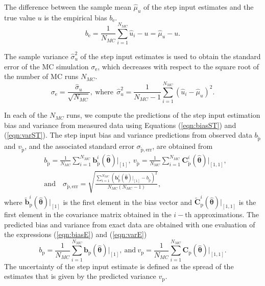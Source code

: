 The difference between the sample mean $\widehat{\mu}_u$ of the step input estimates and the true value $u$ is the empirical bias $b_\mathrm{e}$.
\begin{equation} {b}_\mathrm{e} = \frac{1}{N_{MC}} \sum_{i=1}^{N_{MC}}{ \widehat{u}_i - u } = \widehat{\mu}_u - u.  \end{equation}

The sample variance $\widehat{\sigma}_u^2$ of the step input estimates is used to obtain the standard error of the MC simulation $\sigma_\mathrm{e}$, which decreases with respect to the square root of the number of MC runs $N_{MC}$. 
\begin{equation}  \sigma_\mathrm{e} = \frac{\widehat{\sigma}_u}{\sqrt{N_{MC}}}, \ \mathrm{where} \ \ \widehat{\sigma}_u^2 = \frac{1}{N_{MC}-1} \sum_{i=1}^{N_{MC}}{ \left( \widehat{u}_i - \widehat{\mu}_u \right)^2 } . \end{equation}

In each of the $N_{MC}$ runs, we compute the predictions of the step input estimation bias and variance from measured data using Equations (\ref{eqn:biasST}) and (\ref{eqn:varST}). 
The step input bias and variance predictions from observed data $b_{\widetilde{\mathrm{p}}}$ and $v_{\widetilde{\mathrm{p}}}$, and the associated standard error $\sigma_{\widetilde{\mathrm{p}}\mathrm{,err}}$, are obtained from
\begin{equation} \begin{aligned} & b_{\widetilde{\mathrm{p}}} = \frac{1}{N_{MC}} \sum_{i=1}^{N_{MC}}{ \mathbf{b}_{\widetilde{\mathrm{p}}}^i \left( \widehat{\bm{\theta}} \right) \big|_{\left[1\right]} }, \ v_{\widetilde{\mathrm{p}}} = \frac{1}{N_{MC}} \sum_{i=1}^{N_{MC}}{ \mathrm{\mathbf{C}}_{\widetilde{\mathrm{p}}}^i \left( \widehat{\bm{\theta}} \right) \big|_{\left[1,1\right]} },  \\ & \mathrm{and} \quad \sigma_{\widetilde{\mathrm{p}}\mathrm{,err}} = \sqrt{   \frac{ \sum_{i=1}^{N_{MC}}{ \left( \mathbf{b}_{\widetilde{\mathrm{p}}}^i \left( \widehat{\bm{\theta}} \right) \big|_{\left[1\right]} - b_{\widetilde{\mathrm{p}}} \right)^2 } }{N_{MC}\left( N_{MC}-1 \right)}  } , \end{aligned} \end{equation}
where $\widetilde{\mathbf{b}}_{\mathrm{p}}^i \left( \widehat{\bm{\theta}} \right) \big|_{\left[1\right]}$ is the first element in the bias vector and $\widetilde{\mathbf{C}}_{\mathrm{p}}^i \left( \widehat{\bm{\theta}} \right) \big|_{\left[1,1\right]}$ is the first element in the covariance matrix obtained in the $i-\mathrm{th}$ approximations.
The predicted bias and variance from exact data are obtained with one evaluation of the expressions
(\ref{eqn:biasE}) and (\ref{eqn:varE})
\begin{equation} b_{\mathrm{p}} = \frac{1}{N_{MC}} \sum_{i=1}^{N_{MC}}{ \mathbf{b}_{\mathrm{p}} \left( \widehat{\bm{\theta}} \right) \big|_{\left[1\right]} }, \ \mathrm{and} \ v_{\mathrm{p}} = \frac{1}{N_{MC}} \sum_{i=1}^{N_{MC}}{ \mathrm{\mathbf{C}}_{\mathrm{p}} \left( \widehat{\bm{\theta}} \right) \big|_{\left[1,1\right]} } . \end{equation}
The uncertainty of the step input estimate is defined as the spread of the estimates that is given by the predicted variance $v_{\mathrm{p}}$.


